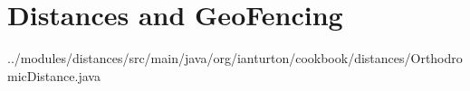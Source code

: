 \chapter{Distances  and GeoFencing}




{../modules/distances/src/main/java/org/ianturton/cookbook/distances/OrthodromicDistance.java}
\label{distance1}
